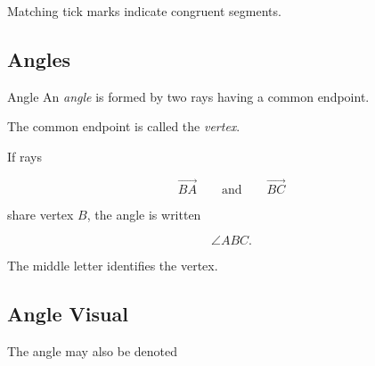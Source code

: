 \begin{centereddiagram}
\end{centereddiagram}

Matching tick marks indicate congruent segments.

\subsection{Angles}
\label{subsec:euclidean-angles}

\begin{definitionbox}{Angle}
An \emph{angle} is formed by two rays having a common endpoint.
\end{definitionbox}

The common endpoint is called the \emph{vertex}.

If rays

\[ \overrightarrow{BA}\qquad\text{and}\qquad\overrightarrow{BC} \]

share vertex \(B\), the angle is written

\[ \angle ABC. \]

The middle letter identifies the vertex.

\subsection{Angle Visual}
\label{subsec:angle-visual}

\begin{centereddiagram}
\end{centereddiagram}

The angle may also be denoted

